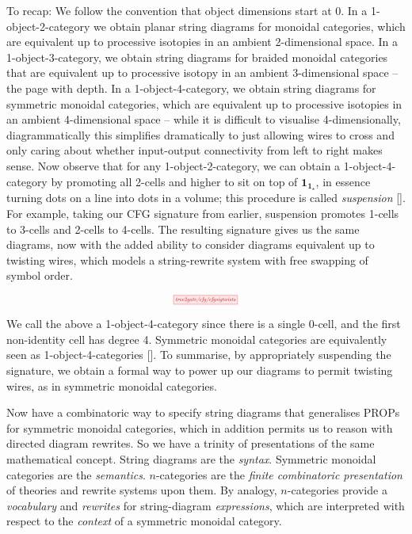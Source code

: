 \begin{fullwidth}
To recap: We follow the convention that object dimensions start at 0. In a 1-object-2-category we obtain planar string diagrams for monoidal categories, which are equivalent up to processive isotopies in an ambient 2-dimensional space. In a 1-object-3-category, we obtain string diagrams for braided monoidal categories that are equivalent up to processive isotopy in an ambient 3-dimensional space -- the page with depth. In a 1-object-4-category, we obtain string diagrams for symmetric monoidal categories, which are equivalent up to processive isotopies in an ambient 4-dimensional space -- while it is difficult to visualise 4-dimensionally, diagrammatically this simplifies dramatically to just allowing wires to cross and only caring about whether input-output connectivity from left to right makes sense. Now observe that for any 1-object-2-category, we can obtain a 1-object-4-category by promoting all 2-cells and higher to sit on top of $\textbf{1}_{\textbf{1}_\star}$, in essence turning dots on a line into dots in a volume; this procedure is called \emph{suspension} []. For example, taking our CFG signature from earlier, suspension promotes 1-cells to 3-cells and 2-cells to 4-cells. The resulting signature gives us the same diagrams, now with the added ability to consider diagrams equivalent up to twisting wires, which models a string-rewrite system with free swapping of symbol order.

\[\scalebox{0.5}{\tikzfig{tree2gate/cfg/cfgsigtwists}}\]

We call the above a 1-object-4-category since there is a single 0-cell, and the first non-identity cell has degree 4. Symmetric monoidal categories are equivalently seen as 1-object-4-categories []. To summarise, by appropriately suspending the signature, we obtain a formal way to power up our diagrams to permit twisting wires, as in symmetric monoidal categories.\\

\begin{remark}
Now have a combinatoric way to specify string diagrams that generalises PROPs for symmetric monoidal categories, which in addition permits us to reason with directed diagram rewrites. So we have a trinity of presentations of the same mathematical concept. String diagrams are the \emph{syntax}. Symmetric monoidal categories are the \emph{semantics}. $n$-categories are the \emph{finite combinatoric presentation} of theories and rewrite systems upon them. By analogy, $n$-categories provide a \emph{vocabulary} and \emph{rewrites} for string-diagram \emph{expressions}, which are interpreted with respect to the \emph{context} of a symmetric monoidal category.
\end{remark}


\end{fullwidth}
